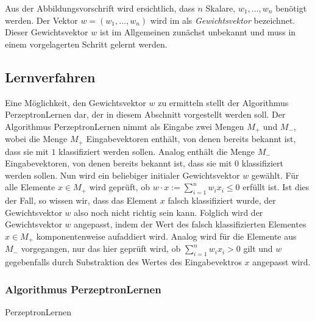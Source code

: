 \documentclass[fontsize=11pt]{scrartcl}
\begin{document}
                Aus der Abbildungsvorschrift wird ersichtlich, dass $n$ Skalare, $w_1,\dots,w_n$ benötigt werden. Der Vektor $w = (w_1,\dots, w_n)$ wird im als \emph{Gewichtsvektor} bezeichnet. Dieser Gewichtsvektor $w$ ist im Allgemeinen zunächst unbekannt und muss in einem vorgelagerten Schritt gelernt werden.
            \subsection{Lernverfahren}
                Eine Möglichkeit, den Gewichtsvektor $w$ zu ermitteln stellt der Algorithmus PerzeptronLernen dar, der in diesem Abschnitt vorgestellt werden soll. Der Algorithmus PerzeptronLernen nimmt als Eingabe zwei Mengen $M_+$ und $M_-$, wobei die Menge $M_+$ Eingabevektoren enthält, von denen bereits bekannt ist, dass sie mit $1$ klassifiziert werden sollen. Analog enthält die Menge $M_-$ Eingabevektoren, von denen bereits bekannt ist, dass sie mit $0$ klassifiziert werden sollen.
                \newline
                Nun wird ein beliebiger initialer Gewichtsvektor $w$ gewählt.
                \newline
                Für alle Elemente $x \in M_+$ wird geprüft, ob $w \cdot x := \sum_{i=1}^nw_ix_i \leq 0$ erfüllt ist. Ist dies der Fall, so wissen wir, dass das Element $x$ falsch klassifiziert wurde, der Gewichtsvektor $w$ also noch nicht richtig sein kann. Folglich wird der Gewichtsvektor $w$ angepasst, indem der Wert des falsch klassifizierten Elementes $x \in M_+$ komponentenweise aufaddiert wird.
                \newline
                Analog wird für die Elemente aus $M_-$ vorgegangen, nur das hier geprüft wird, ob $\sum_{i=1}^nw_ix_i > 0$ gilt und $w$ gegebenfalls durch Substraktion des Wertes des Eingabevektros $x$ angepasst wird.
                \subsubsection{Algorithmus PerzeptronLernen}
                    \begin{algorithm}[H]
                        \caption{PerzeptronLernen}
                    \end{algorithm}
                
\end{document}
